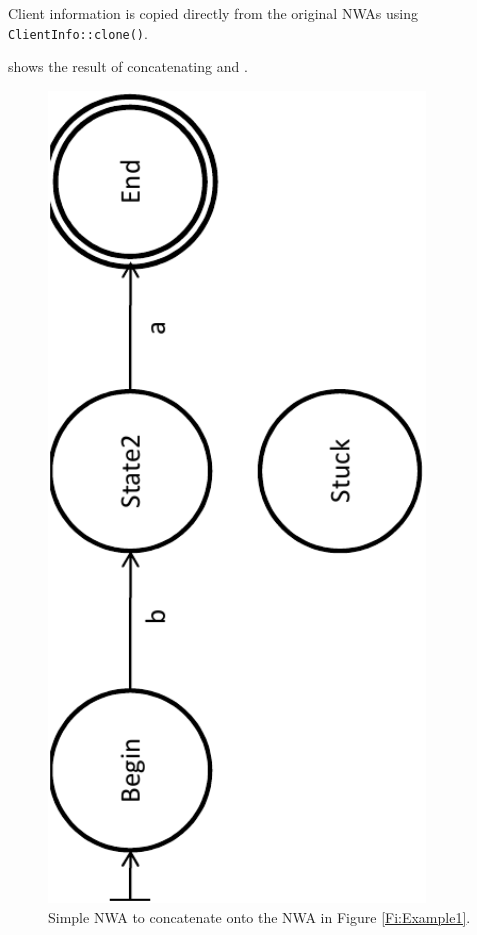 
Client information is copied directly from the original NWAs using
\texttt{ClientInfo::clone()}.

 shows the result of concatenating  and
.



\begin{figure}[p]
  \centering
    \includegraphics[width=10cm]{Figures/Figure9}
  \caption{Simple NWA to concatenate onto the NWA in Figure \ref{Fi:Example1}.}
  \label{Fi:Concat1}
\end{figure}

